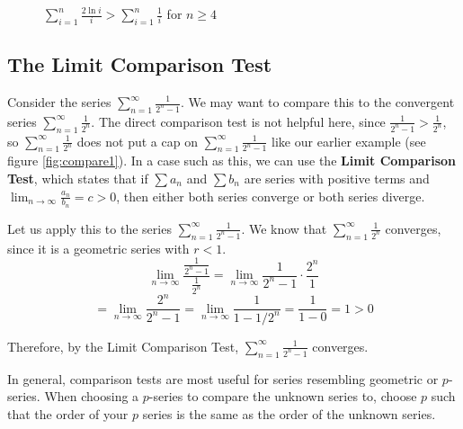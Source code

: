 \begin{figure}
    \centering
    \caption{$\sum_{i=1}^n \frac{2\ln{i}}{i} > \sum_{i=1}^n \frac{1}{i}$ 
    for $n \geq 4$}
    \label{fig:compare2}
\end{figure}

\subsection{The Limit Comparison Test}
Consider the series $\sum_{n=1}^\infty 
\frac{1}{2^n - 1}$. We may want to compare this to the convergent series $\sum_
{n=1}^\infty \frac{1}{2^n}$. The direct comparison test is not helpful here, 
since $\frac{1}{2^n - 1} > \frac{1}{2^n}$, so $\sum_{n=1}^\infty \frac{1}{2^n}$ 
does not put a cap on $\sum_{n=1}^\infty \frac{1}{2^n - 1}$ like our earlier 
example (see figure \ref{fig:compare1}). In a case such as this, we can use 
the \textbf{Limit Comparison Test}, which states that
if $\sum a_n$ and $\sum b_n$ are series with positive terms and $\lim_{n \to 
\infty} \frac{a_n}{b_n} = c > 0$, then either both series converge or both 
series diverge.

Let us apply this to the series $\sum_{n=1}^\infty \frac{1}{2^n - 1}$. We know 
that $\sum_{n=1}^\infty \frac{1}{2^n}$ converges, since it is a geometric 
series with $r < 1$. 
$$\lim_{n \to \infty} \frac{\frac{1}{2^n - 1}}{\frac{1}{2^n}} = \lim_{n \to 
\infty} \frac{1}{2^n - 1} \cdot \frac{2^n}{1}$$
$$= \lim_{n \to \infty} \frac{2^n}{2^n - 1} = \lim_{n \to \infty} \frac{1}{1 - 
1/2^n} = \frac{1}{1-0} = 1 > 0$$

Therefore, by the Limit Comparison Test, $\sum_{n=1}^\infty \frac{1}{2^n - 1}$ 
converges.

In general, comparison tests are most useful for series resembling geometric 
or $p$-series. When choosing a $p$-series to compare the unknown series to, 
choose $p$ such that the order of your $p$ series is the same as the order of 
the unknown series.

